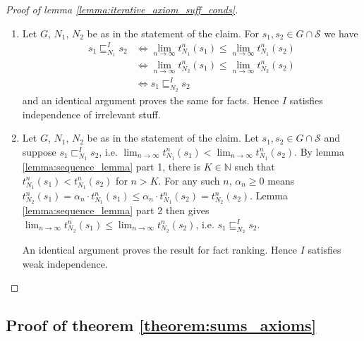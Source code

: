 \documentclass{article}
\theoremstyle{definition} \newtheorem{definition}{Definition}
\theoremstyle{definition} \newtheorem{example}{Example}
\theoremstyle{plain} \newtheorem{axiom}{Axiom}
\theoremstyle{plain} \newtheorem*{remark}{Remark}
\theoremstyle{remark} \newtheorem*{notation}{Notation}
\theoremstyle{plain} \newtheorem{lemma}{Lemma}
\theoremstyle{plain} \newtheorem{theorem}{Theorem}
\theoremstyle{plain} \newtheorem{proposition}{Proposition}
\renewcommand{\S}{\mathcal{S}}  %
\newcommand{\Nat}{\mathbb{N}}
\newcommand{\sle}{\sqsubseteq}
\newcommand{\slt}{\sqsubset}
\begin{document}
\begin{proof}[Proof of lemma \ref{lemma:iterative_axiom_suff_conds}]
\begin{enumerate}
\item Let $G$, $N_1$, $N_2$ be as in the statement of the claim. For $s_1, s_2
\in G \cap \S$ we have
\begin{align*}
    s_1 \sle_{N_1}^I s_2
    & \iff \lim_{n \rightarrow \infty}{t_{N_1}^n(s_1)} \le \lim_{n \rightarrow
        \infty}{t_{N_1}^n(s_2)} \\
    & \iff \lim_{n \rightarrow \infty}{t_{N_2}^n(s_1)} \le \lim_{n \rightarrow
        \infty}{t_{N_2}^n(s_2)} \\
    & \iff s_1 \sle_{N_2}^I s_2
\end{align*}
and an identical argument proves the same for facts. Hence $I$ satisfies
independence of irrelevant stuff.

\item Let $G$, $N_1$, $N_2$ be as in the statement of the claim. Let $s_1, s_2
\in G \cap \S$ and suppose $s_1 \slt_{N_1}^I s_2$, i.e. $\lim_{n \rightarrow
\infty}{t_{N_1}^n(s_1)} < \lim_{n \rightarrow \infty}{t_{N_1}^n(s_2)}$. By
lemma \ref{lemma:sequence_lemma} part 1, there is $K \in \Nat$ such that
$t_{N_1}^n(s_1) < t_{N_1}^n(s_2)$ for $n > K$. For any such $n$, $\alpha_n \ge
0$ means $t_{N_2}^n(s_1) = \alpha_n \cdot t_{N_1}^n(s_1) \le \alpha_n \cdot
t_{N_1}^n(s_2) = t_{N_2}^n(s_2)$. Lemma \ref{lemma:sequence_lemma} part 2 then
gives $\lim_{n \rightarrow \infty}t_{N_2}^n(s_1) \le \lim_{n \rightarrow
\infty}t_{N_2}^n(s_2)$, i.e. $s_1 \sle_{N_2}^I s_2$.

An identical argument proves the result for fact ranking. Hence $I$ satisfies
weak independence.
\end{enumerate}

\end{proof}

\subsection{Proof of theorem \ref{theorem:sums_axioms}}
\end{document}
